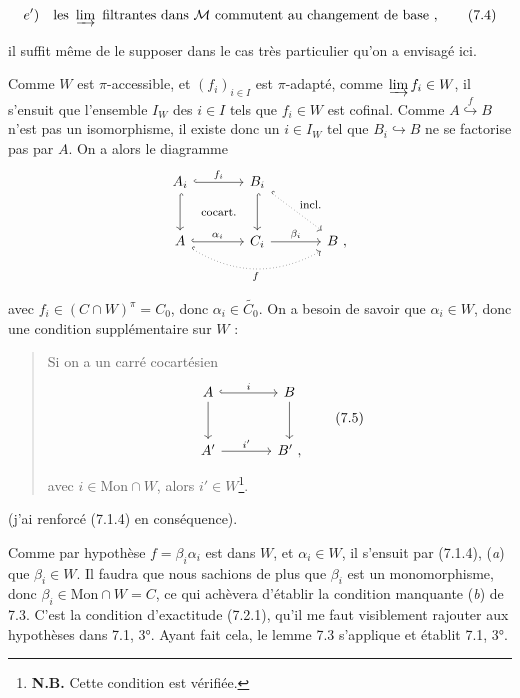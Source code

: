 \documentclass[11pt]{article}
\newcommand{\printedpage}[1]{\marginpar{\raggedright\footnotesize p.~#1}}
\newcommand{\msp}[1]{\marginpar{\raggedright\footnotesize [#1]}}
\newcommand{\Mon}{\mathrm{Mon}}
\begin{document}
\msp{page 95}
\[
e')\quad \text{les } \varinjlim \text{ filtrantes dans } \mathcal{M} \text{ commutent au changement de base}\ , \tag*{(7.4)}
\]

il suffit même de le supposer dans le cas très particulier qu'on a envisagé ici.

Comme $W$ est $\pi$-accessible, et $(f_i)_{i \in I}$ est $\pi$-adapté, comme $\varinjlim f_i \in W$, il s'ensuit que l'ensemble $I_W$ des $i \in I$ tels que $f_i \in W$ est cofinal. Comme $A \overset{f}{\hookrightarrow} B$ n'est pas un isomorphisme, il existe donc un $i \in I_W$ tel que $B_i \hookrightarrow B$ ne se factorise pas par $A$. On a alors le diagramme
\[
\begin{tikzcd}[row sep=large, column sep=large]
A_i \arrow[r, hook, "f_i"] \arrow[d, hook] \arrow[rd, phantom, "\text{\footnotesize cocart.}"] & B_i \arrow[d, hook] \arrow[rd, dotted, hook, "\text{\footnotesize incl.}"] & \\
A \arrow[r, hook, "\alpha_i"] \arrow[rr, dotted, hook, bend right, "f"'] & C_i \arrow[r, "\beta_i"] & B \ ,
\end{tikzcd}
\]

\printedpage{53}
avec $f_i \in (C \cap W)^{\pi} = C_0$, donc $\alpha_i \in \widetilde{C_0}$. On a besoin de savoir que $\alpha_i \in W$, donc une condition supplémentaire sur $W$ :

\begin{quote}
Si on a un carré cocartésien
\[
\begin{tikzcd}[row sep=large, column sep=large]
A \arrow[r, hook, "i"] \arrow[d] & B \arrow[d] \\
A' \arrow[r, "{i'}"] & B' \ ,
\end{tikzcd}
\tag*{(7.5)}
\]
avec $i \in \Mon \cap W$, alors $i' \in W$\footnote[34]{\textbf{N.B.} Cette condition est vérifiée.}.
\end{quote}

(j'ai renforcé (7.1.4) en conséquence).

\msp{page 96}

Comme par hypothèse $f = \beta_i \alpha_i$ est dans $W$, et $\alpha_i \in W$, il s'ensuit par (7.1.4), (\textit{a}) que $\beta_i \in W$. Il faudra que nous sachions de plus que $\beta_i$ est un monomorphisme, donc $\beta_i \in \Mon \cap W = C$, ce qui achèvera d'établir la condition manquante (\textit{b}) de 7.3. C'est la condition d'exactitude (7.2.1), qu'il me faut visiblement rajouter aux hypothèses dans 7.1, 3°. Ayant fait cela, le lemme 7.3 s'applique et établit 7.1, 3°.
\end{document}
